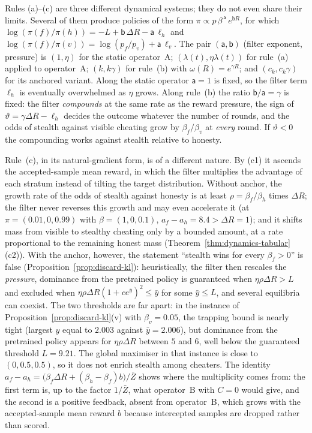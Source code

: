 \begin{remark}
\label{rem:taxonomy}
Rules (a)--(c) are three different dynamical systems; they do not even
share their limits. Several of them produce policies of the form
$\pi\propto p\,\beta^{\,\mathsf a}\,e^{\mathsf bR}$, for which
$\log(\pi(f)/\pi(h))=-L+\mathsf b\,\Delta R-\mathsf a\,\ell_h$ and
$\log(\pi(f)/\pi(v))=\log(p_f/p_v)+\mathsf a\,\ell_v$. The pair
$(\mathsf a,\mathsf b)$ (filter exponent, pressure) is
$(1,\eta)$ for the static operator~A;
$(\lambda(t),\eta\lambda(t))$ for rule~(a) applied to operator~A;
$(k,k\gamma)$ for rule~(b) with $\omega(R)=e^{\gamma R}$; and
$(c_k,c_k\gamma)$ for its anchored variant. Along the static operator
$\mathsf a=1$ is fixed, so the filter term $\ell_h$ is eventually
overwhelmed as $\eta$ grows. Along rule~(b) the ratio
$\mathsf b/\mathsf a=\gamma$ is fixed: the filter \emph{compounds} at the
same rate as the reward pressure, the sign of
$\vartheta=\gamma\Delta R-\ell_h$ decides the outcome whatever the number
of rounds, and the odds of stealth against visible cheating grow by
$\beta_f/\beta_v$ at \emph{every} round. If $\vartheta<0$ the compounding
works against stealth relative to honesty.

Rule~(c), in its natural-gradient form, is of a different nature. By (c1) it ascends the accepted-sample
mean reward, in which the filter multiplies the advantage of each stratum
instead of tilting the target distribution. Without anchor, the growth rate of the odds of stealth against honesty is at least $\rho=\beta_f/\beta_h$ times $\Delta R$; the filter never reverses this growth and may even accelerate it (at $\pi=(0.01,0,0.99)$ with $\beta=(1,0,0.1)$, $a_f-a_h=8.4>\Delta R=1$); and it shifts mass from
visible to stealthy cheating only by a bounded amount, at a rate
proportional to the remaining honest mass
(Theorem~\ref{thm:dynamics-tabular}(c2)). With the anchor, however, the
statement ``stealth wins for every $\beta_f>0$'' is false
(Proposition~\ref{prop:discard-kl}): heuristically, the filter then rescales the
\emph{pressure}, dominance from the pretrained policy is guaranteed when
$\eta\rho\Delta R>L$ and excluded when
$\eta\rho\Delta R(1+ce^{\bar y})^2\le\bar y$ for some $\bar y\le L$, and
several equilibria can coexist. The two thresholds are far apart: in the instance of Proposition~\ref{prop:discard-kl}(v) with $\beta_v=0.05$, the trapping bound is nearly tight (largest $y$ equal to $2.003$ against $\bar y=2.006$), but dominance from the pretrained policy appears for $\eta\rho\Delta R$ between $5$ and $6$, well below the guaranteed threshold $L=9.21$. The global maximiser in that instance is close to $(0,0.5,0.5)$, so it does not enrich stealth among cheaters. The identity
$a_f-a_h=\bigl(\beta_f\Delta R+(\beta_h-\beta_f)b\bigr)/\bar Z$ shows where
the multiplicity comes from: the first term is, up to the factor $1/\bar Z$, what operator~B with $C=0$
would give, and the second is a positive feedback, absent from
operator~B, which grows with the accepted-sample mean reward $b$ because
intercepted samples are dropped rather than scored.


\end{remark}
